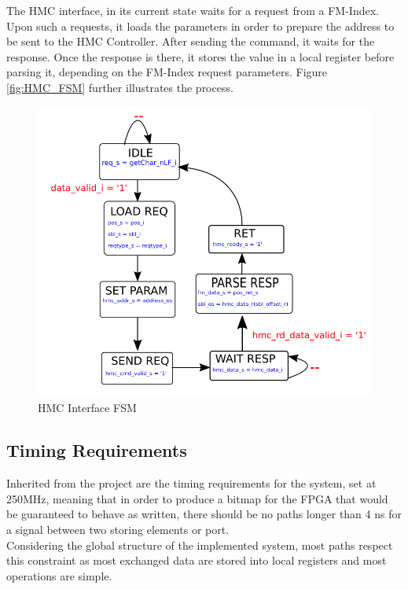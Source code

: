 The HMC interface, in its current state waits for a request from a FM-Index. Upon such a requests, it loads the parameters in order to prepare the address to be sent to the HMC Controller. After sending the command, it waits for the response. Once the response is there, it stores the value in a local register before parsing it, depending on the FM-Index request parameters. Figure \ref{fig:HMC_FSM} further illustrates the process.

\begin{figure}[H]
    \centering
    \hspace*{-20mm}\includegraphics[scale = 0.45]{Figures/HMC_FSM.png}
    \caption{HMC Interface FSM}
    \label{fig:HMC_DIAG}
\end{figure}


\subsection{Timing Requirements}

Inherited from the project are the timing requirements for the system, set at 250MHz, meaning that in order to produce a bitmap for the FPGA that would be guaranteed to behave as written, there should be no paths longer than 4 ns for a signal between two storing elements or port. \\
Considering the global structure of the implemented system, most paths respect this constraint as most exchanged data are stored into local registers and most operations are simple.\\


